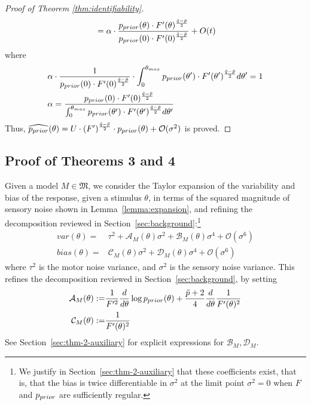 \begin{proof}[Proof of Theorem \ref{thm:identifiability}]
\begin{align*}
    &= \alpha \cdot \frac{p_{prior}(\theta) \cdot F'(\theta)^{\frac{\tilde{q}-\tilde{p}}{2}}}{p_{prior}(0) \cdot F'(0)^{\frac{\tilde{q}-\tilde{p}}{2}}} + O(t)\\
\end{align*}
where
\begin{align*}
    \alpha &\cdot \frac{1}{p_{prior}(0) \cdot F'(0)^{\frac{\tilde{q}-\tilde{p}}{2}}} \cdot \int_0^{\theta_{max}} p_{prior}(\theta') \cdot F'(\theta')^{\frac{\tilde{q}-\tilde{p}}{2}} d\theta' = 1\\
    \alpha &= \frac{p_{prior}(0) \cdot F'(0)^{\frac{\tilde{q}-\tilde{p}}{2}}}{\int_0^{\theta_{max}} p_{prior}(\theta') \cdot F'(\theta')^{\frac{\tilde{q}-\tilde{p}}{2}} d\theta'}\\  
\end{align*}
Thus, $\widehat{p_{prior}}(\theta) = U \cdot (F')^{\frac{\tilde{q}-\tilde{p}}{2}} \cdot p_{prior}(\theta) + \mathcal{O}(\sigma^2)$ is proved.

\end{proof}


\subsection{Proof of Theorems 3 and 4}\label{sec:theorems-two-levels}


Given a model $M \in \mathfrak{M}$, we consider the Taylor expansion of the variability and bias of the response, given a stimulus $\theta$, in terms of the squared magnitude of sensory noise shown in Lemma~\ref{lemma:expansion}, and refining the decomposition reviewed in Section~\ref{sec:background}:\footnote{We justify in Section~\ref{sec:thm-2-auxiliary} that these coefficients exist, that is, that the bias is twice differentiable in $\sigma^2$ at the limit point $\sigma^2=0$ when $F$ and $p_{prior}$ are sufficiently regular.}
\begin{align*}
var(\theta) =& 
\tau^2 + \mathcal{A}_M(\theta) \sigma^2 + \mathcal{B}_M(\theta) \sigma^4 + \mathcal{O}(\sigma^6) \\
    bias(\theta) =& 
    \mathcal{C}_M(\theta) \sigma^2 + \mathcal{D}_M(\theta) \sigma^4 + \mathcal{O}(\sigma^6)
\end{align*}
where $\tau^2$ is the motor noise variance, and $\sigma^2$ is the sensory noise variance. This refines the decomposition reviewed in Section~\ref{sec:background}, by setting
\begin{align*}
    \mathcal{A}_M(\theta) :=& \frac{1}{F'^2} \frac{d}{d\theta} \log p_{prior}(\theta) + \frac{\tilde{p}+2}{4} \frac{d}{d\theta} \frac{1}{F'(\theta)^2} \\
    \mathcal{C}_M(\theta) :=& \frac{1}{F'(\theta)^2}
\end{align*}
See Section~\ref{sec:thm-2-auxiliary} for explicit expressions for $\mathcal{B}_M, \mathcal{D}_M$.

